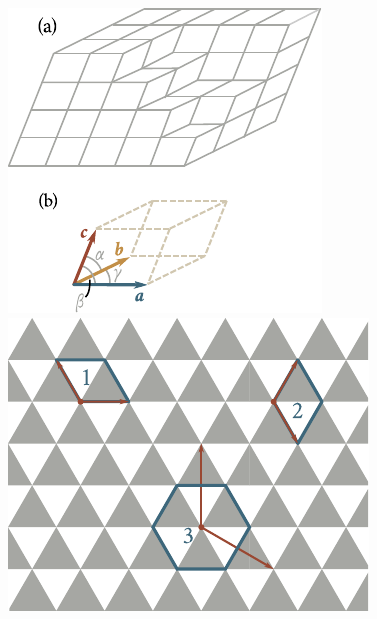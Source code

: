 \begin{figure}[!htb]
	\begin{minipage}[t]{0.5\linewidth}
		\begin{center}
			\includegraphics[scale=1]{figures/ch_13/fig_13_1.pdf}
			\caption[]{}
			\label{fig:13_1}
		\end{center}
	\end{minipage}
	\hspace{-0.05cm}
	\begin{minipage}[t]{0.5\linewidth}
		\begin{center}
			\includegraphics[scale=1]{figures/ch_13/fig_13_2.pdf}
			\caption[]{}
			\label{fig:13_2}
		\end{center}
	\end{minipage}
	\vspace{-0.4cm}
\end{figure}


